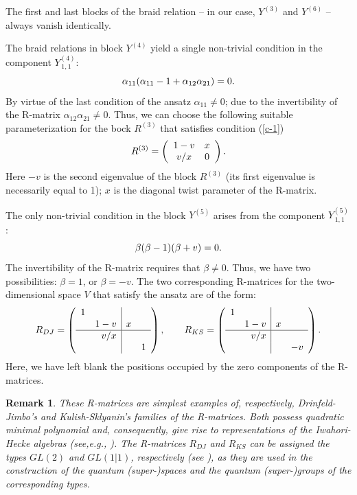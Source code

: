 \documentclass[11pt]{article}
\def\be{\begin{equation}}\def\ee{\end{equation}}
\newcounter{theorem}\def\thetheorem{\thesection.\arabic{theorem}}\makeatletter
\newtheorem{rem}[theorem]{Remark}
\begin{document}
The first and last blocks of the braid relation -- in our case, $Y^{(3)}$ and $Y^{(6)}$ --  always vanish identically.

The braid relations in block $Y^{(4)}$ yield a single non-trivial condition in the component $Y^{(4)}_{\,1,1}$:
\be
\lb{c-1}
\alpha_{11}(\alpha_{11}-1+\alpha_{12}\alpha_{21}) =0.
\ee
By virtue of the last condition of the ansatz $\alpha_{11}\neq 0$; due to the invertibility of the R-matrix $\alpha_{12}\alpha_{21}\neq 0$.
Thus, we can choose the following suitable parameterization for the bock $R^{(3)}$ that satisfies condition (\ref{c-1})
\be
\lb{R(3)}
R^{(3)} =\left(
\begin{array}{cc}
	1-v &	x
	\\
	v/x & 	 0
\end{array}\right).
\ee
Here $-v$ is the second eigenvalue of the block $R^{(3)}$ (its first eigenvalue is necessarily equal to 1); $x$ is the diagonal twist parameter of the R-matrix. 

The only non-trivial condition in the block $Y^{(5)}$ arises from the component $Y^{(5)}_{\,1,1}$:
\be
\lb{c-2}
\beta(\beta -1)(\beta +v) =0.
\ee
The invertibility of the R-matrix requires that $\beta\neq 0$. Thus, we have two possibilities: $\beta=1$, or $\beta=-v$. The two corresponding R-matrices for the two-dimensional space $V$ that satisfy the ansatz are of the form:
\be
\lb{dim2-R}
R_{DJ}=\left(
\begin{array}{lr|lr}
	1 &  &  &  
	\\
	 & 1-v & x &
	 \\
	  \hline
	 & v/x &   &
	 \\
	 &  &  &  1
\end{array}
\right),\qquad
R_{KS}=\left(
\begin{array}{lr|lr}
	1 &  &  &  
	\\
	& 1-v & x &
	\\
	\hline
	& v/x &   &
	\\
	&  &  &  -v
\end{array}
\right).
\ee
Here, we have left blank the positions occupied by the  zero components of the R-matrices.

\begin{rem}
	{\rm 
These R-matrices are simplest examples of, respectively,  {\em Drinfeld-Jimbo's} \cite{D,Ji} and {\em Kulish-Sklyanin's} \cite{KS} families of the R-matrices. Both possess quadratic minimal polynomial and, consequently, give rise to representations of the Iwahori-Hecke algebras (see,e.g., \cite{Jo}).  The R-matrices  $R_{DJ}$ and $R_{KS}$ can be assigned the types $GL(2)$ and $GL(1|1)$, respectively (see \cite{GPS}), as they are used in the construction of the quantum (super-)spaces and the quantum (super-)groups of the corresponding types.
}
\end{rem}
\end{document}
